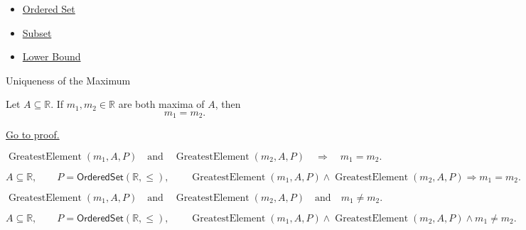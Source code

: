 \begin{dependencies}
\begin{itemize}
  \item \hyperref[def:ordered-set]{Ordered Set}
  \item \hyperref[def:subset]{Subset}
  \item \hyperref[def:real-lower-bound]{Lower Bound}
\end{itemize}
\end{dependencies}

\begin{propositionbox}{Uniqueness of the Maximum}
\begin{proposition}
\label{prop:uniqueness-of-the-maximum}
Let $A\subseteq\mathbb{R}$. If $m_1,m_2\in\mathbb{R}$ are both maxima of
$A$, then
\[
  m_1=m_2.
\]

\hyperref[prf:uniqueness-of-the-maximum]{Go to proof.}
\end{proposition}
\end{propositionbox}

\begin{remark*}
\[
  \operatorname{GreatestElement}(m_{1},A,P)
  \quad\text{and}\quad
  \operatorname{GreatestElement}(m_{2},A,P)
  \quad\Longrightarrow\quad
  m_{1}=m_{2}.
\]
\end{remark*}

\begin{remark*}
\[
  A\subseteq\mathbb{R},\qquad P=\mathsf{OrderedSet}(\mathbb{R},\leq),\qquad
  \operatorname{GreatestElement}(m_{1},A,P)\land
  \operatorname{GreatestElement}(m_{2},A,P)
  \Longrightarrow m_{1}=m_{2}.
\]
\end{remark*}

\begin{remark*}
\[
  \operatorname{GreatestElement}(m_{1},A,P)
  \quad\text{and}\quad
  \operatorname{GreatestElement}(m_{2},A,P)
  \quad\text{and}\quad
  m_{1}\neq m_{2}.
\]
\end{remark*}

\begin{remark*}
\[
  A\subseteq\mathbb{R},\qquad P=\mathsf{OrderedSet}(\mathbb{R},\leq),\qquad
  \operatorname{GreatestElement}(m_{1},A,P)\land
  \operatorname{GreatestElement}(m_{2},A,P)\land m_{1}\neq m_{2}.
\]
\end{remark*}

